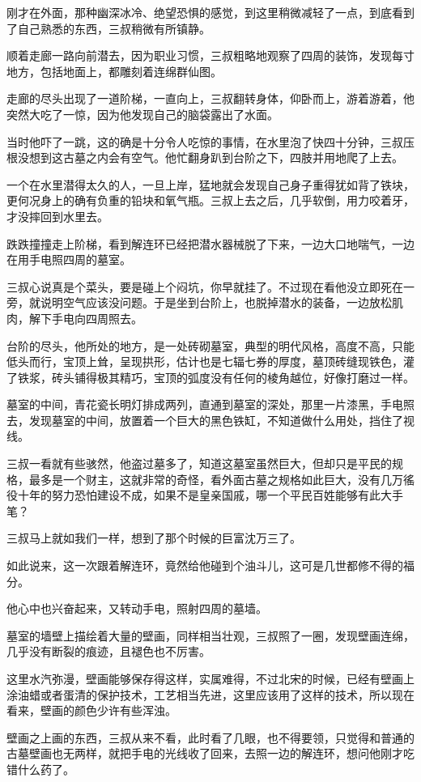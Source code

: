 刚才在外面，那种幽深冰冷、绝望恐惧的感觉，到这里稍微减轻了一点，到底看到了自己熟悉的东西，三叔稍微有所镇静。

顺着走廊一路向前潜去，因为职业习惯，三叔粗略地观察了四周的装饰，发现每寸地方，包括地面上，都雕刻着连绵群仙图。

走廊的尽头出现了一道阶梯，一直向上，三叔翻转身体，仰卧而上，游着游着，他突然大吃了一惊，因为他发现自己的脑袋露出了水面。

当时他吓了一跳，这的确是十分令人吃惊的事情，在水里泡了快四十分钟，三叔压根没想到这古墓之内会有空气。他忙翻身趴到台阶之下，四肢并用地爬了上去。

一个在水里潜得太久的人，一旦上岸，猛地就会发现自己身子重得犹如背了铁块，更何况身上的确有负重的铅块和氧气瓶。三叔上去之后，几乎软倒，用力咬着牙，才没摔回到水里去。

跌跌撞撞走上阶梯，看到解连环已经把潜水器械脱了下来，一边大口地喘气，一边在用手电照四周的墓室。

三叔心说真是个菜头，要是碰上个闷坑，你早就挂了。不过现在看他没立即死在一旁，就说明空气应该没问题。于是坐到台阶上，也脱掉潜水的装备，一边放松肌肉，解下手电向四周照去。

台阶的尽头，他所处的地方，是一处砖砌墓室，典型的明代风格，高度不高，只能低头而行，宝顶上耸，呈现拱形，估计也是七辐七券的厚度，墓顶砖缝现铁色，灌了铁浆，砖头铺得极其精巧，宝顶的弧度没有任何的棱角越位，好像打磨过一样。

墓室的中间，青花瓷长明灯排成两列，直通到墓室的深处，那里一片漆黑，手电照去，发现墓室的中间，放置着一个巨大的黑色铁缸，不知道做什么用处，挡住了视线。

三叔一看就有些骇然，他盗过墓多了，知道这墓室虽然巨大，但却只是平民的规格，最多是一个财主，这就非常的奇怪，看外面古墓之规格如此巨大，没有几万徭役十年的努力恐怕建设不成，如果不是皇亲国戚，哪一个平民百姓能够有此大手笔？

三叔马上就如我们一样，想到了那个时候的巨富沈万三了。

如此说来，这一次跟着解连环，竟然给他碰到个油斗儿，这可是几世都修不得的福分。

他心中也兴奋起来，又转动手电，照射四周的墓墙。

墓室的墙壁上描绘着大量的壁画，同样相当壮观，三叔照了一圈，发现壁画连绵，几乎没有断裂的痕迹，且褪色也不厉害。

这里水汽弥漫，壁画能够保存得这样，实属难得，不过北宋的时候，已经有壁画上涂油蜡或者蛋清的保护技术，工艺相当先进，这里应该用了这样的技术，所以现在看来，壁画的颜色少许有些浑浊。

壁画之上画的东西，三叔从来不看，此时看了几眼，也不得要领，只觉得和普通的古墓壁画也无两样，就把手电的光线收了回来，去照一边的解连环，想问他刚才吃错什么药了。

